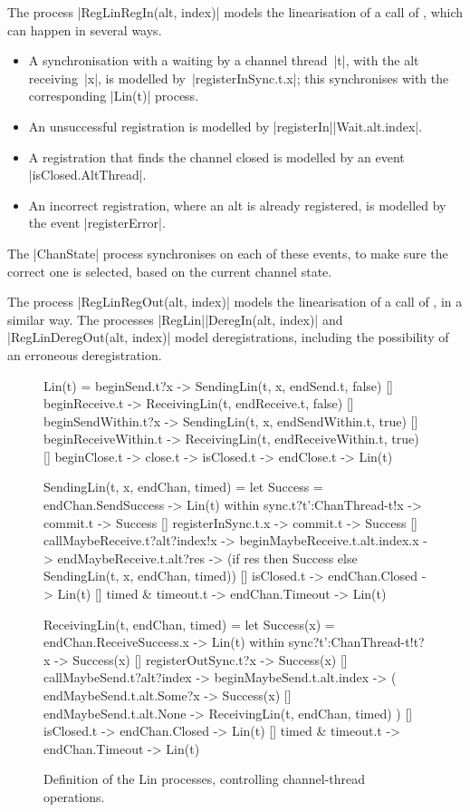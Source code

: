 The process |RegLinRegIn(alt, index)| models the linearisation of a call of
, which can happen in several ways.
%
\begin{itemize}
\item A synchronisation with a waiting  by a channel thread~|t|,
  with the alt receiving~|x|, is modelled by~|registerInSync.t.x|;
  this synchronises with the corresponding |Lin(t)| process.

\item An unsuccessful registration is modelled by
  |registerIn|\-|Wait.alt.index|.

\item A registration that finds the channel closed is modelled by an event
  |isClosed.AltThread|.

\item An incorrect registration, where an alt is already registered, is
  modelled by the event |registerError|.
\end{itemize}
% 
The |ChanState| process synchronises on each of these events, to make sure the
correct one is selected, based on the current channel state. 

The process |RegLinRegOut(alt, index)| models the linearisation of a call of
, in a similar way.  The processes
|RegLin|\-|DeregIn(alt, index)| and |RegLinDeregOut(alt, index)| model
deregistrations, including the possibility of an erroneous deregistration.


\begin{figure}
\begin{cspm}
Lin(t) = 
  beginSend.t?x -> SendingLin(t, x, endSend.t, false)
  [] beginReceive.t -> ReceivingLin(t, endReceive.t, false)
  [] beginSendWithin.t?x -> SendingLin(t, x, endSendWithin.t, true)
  [] beginReceiveWithin.t -> ReceivingLin(t, endReceiveWithin.t, true) 
  [] beginClose.t -> close.t -> isClosed.t -> endClose.t -> Lin(t)
  
SendingLin(t, x, endChan, timed) = 
  let Success = endChan.SendSuccess -> Lin(t) within
  sync.t?t':ChanThread-{t}!x -> commit.t -> Success
  [] registerInSync.t.x -> commit.t -> Success
  [] callMaybeReceive.t?alt?index!x -> beginMaybeReceive.t.alt.index.x -> 
    endMaybeReceive.t.alt?res -> 
    (if res then Success else SendingLin(t, x, endChan, timed))
  [] isClosed.t -> endChan.Closed -> Lin(t)
  [] timed & timeout.t -> endChan.Timeout -> Lin(t)
  
ReceivingLin(t, endChan, timed) =  
  let Success(x) = endChan.ReceiveSuccess.x -> Lin(t) within
  sync?t':ChanThread-{t}!t?x -> Success(x) 
  [] registerOutSync.t?x -> Success(x) 
  [] callMaybeSend.t?alt?index -> beginMaybeSend.t.alt.index -> (
    endMaybeSend.t.alt.Some?x -> Success(x) 
    [] endMaybeSend.t.alt.None -> ReceivingLin(t, endChan, timed) )
  [] isClosed.t -> endChan.Closed -> Lin(t)
  [] timed & timeout.t -> endChan.Timeout -> Lin(t)
\end{cspm}
\caption{Definition of the {\scalashape Lin} processes, controlling
  channel-thread operations.  \label{fig:Lin}}
\end{figure}

